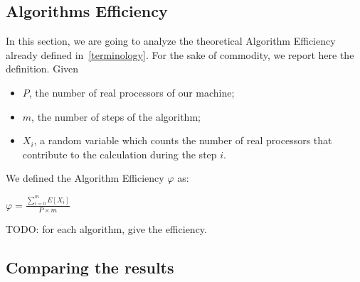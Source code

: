 

\subsection{Algorithms Efficiency}
In this section, we are going to analyze the theoretical Algorithm Efficiency already defined in~\ref{terminology}. For the sake of commodity, we report here the definition. Given
\begin{itemize}
\item $P$, the number of real processors of our machine; 
\item $m$, the number of steps of the algorithm;
\item $X_i$, a random variable which counts the number of real processors that contribute to the calculation during the step $i$.
\end{itemize}
We defined the Algorithm Efficiency $\varphi$ as:
\begin{center}
$\varphi = \frac{\sum_{i=0}^m E[X_i]}{P \times m} $
\end{center}
TODO: for each algorithm, give the efficiency.

\subsection{Comparing the results}